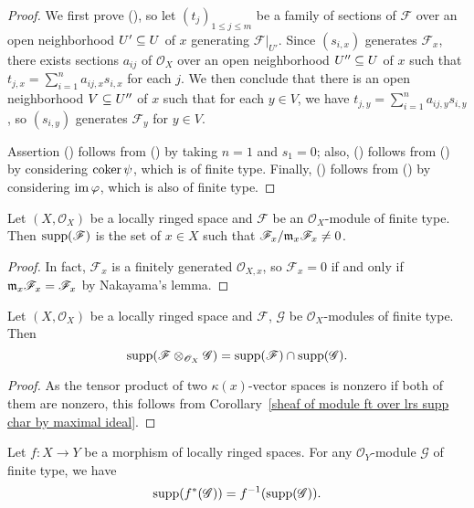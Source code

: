 \begin{proof}
We first prove (), so let $(t_j)_{1\leq j\leq m}$ be a family of sections of $\mathscr{F}$ over an open neighborhood $U'\subseteq U$ of $x$ generating $\mathscr{F}|_{U'}$. Since $(s_{i,x})$ generates $\mathscr{F}_x$, there exists sections $a_{ij}$ of $\mathscr{O}_X$ over an open neighborhood $U''\subseteq U$ of $x$ such that $t_{j,x}=\sum_{i=1}^{n}a_{ij,x}s_{i,x}$ for each $j$. We then conclude that there is an open neighborhood $V\subseteq U''$ of $x$ such that for each $y\in V$, we have $t_{j,y}=\sum_{i=1}^{n}a_{ij,y}s_{i,y}$, so $(s_{i,y})$ generates $\mathscr{F}_y$ for $y\in V$.\par
Assertion () follows from () by taking $n=1$ and $s_1=0$; also, () follows from () by considering $\operatorname{coker}\psi$, which is of finite type. Finally, () follows from () by considering $\operatorname{im}\varphi$, which is also of finite type. 
\end{proof}
\begin{corollary}\label{sheaf of module ft over lrs supp char by maximal ideal}
Let $(X,\mathscr{O}_X)$ be a locally ringed space and $\mathscr{F}$ be an $\mathscr{O}_X$-module of finite type. Then $\mathrm{supp}(\mathscr{F})$ is the set of $x\in X$ such that $\mathscr{F}_x/\mathfrak{m}_x\mathscr{F}_x\neq 0$.
\end{corollary}
\begin{proof}
In fact, $\mathscr{F}_x$ is a finitely generated $\mathscr{O}_{X,x}$, so $\mathscr{F}_x=0$ if and only if $\mathfrak{m}_x\mathscr{F}_x=\mathscr{F}_x$ by Nakayama's lemma.
\end{proof}
\begin{corollary}\label{sheaf of module ft over lrs supp of tensor}
Let $(X,\mathscr{O}_X)$ be a locally ringed space and $\mathscr{F}$, $\mathscr{G}$ be $\mathscr{O}_X$-modules of finite type. Then
\[\mathrm{supp}(\mathscr{F}\otimes_{\mathscr{O}_X}\mathscr{G})=\mathrm{supp}(\mathscr{F})\cap\mathrm{supp}(\mathscr{G}).\]
\end{corollary}
\begin{proof}
As the tensor product of two $\kappa(x)$-vector spaces is nonzero if both of them are nonzero, this follows from Corollary~\ref{sheaf of module ft over lrs supp char by maximal ideal}.
\end{proof}
\begin{corollary}
Let $f:X\to Y$ be a morphism of locally ringed spaces. For any $\mathscr{O}_Y$-module $\mathscr{G}$ of finite type, we have
\[\mathrm{supp}(f^*(\mathscr{G}))=f^{-1}(\mathrm{supp}(\mathscr{G})).\]
\end{corollary}
